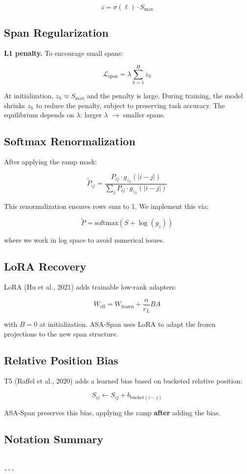 \[
z = \sigma(\ell) \cdot S_\text{max}
\]

\subsection{Span Regularization}

\textbf{L1 penalty.} To encourage small spans:

\[
\mathcal{L}_\text{span} = \lambda \sum_{h=1}^H z_h
\]

At initialization, $z_h \approx S_\text{max}$ and the penalty is large. During 
training, the model shrinks $z_h$ to reduce the penalty, subject to preserving 
task accuracy. The equilibrium depends on $\lambda$: larger $\lambda$ $\to$ 
smaller spans.

\subsection{Softmax Renormalization}

After applying the ramp mask:

\[
\tilde{P}_{ij} = \frac{P_{ij} \cdot g_{z_h}(|i - j|)}{\sum_j P_{ij} \cdot g_{z_h}(|i - j|)}
\]

This renormalization ensures rows sum to 1. We implement this via:

\[
\tilde{P} = \text{softmax}(S + \log(g_z))
\]

where we work in log space to avoid numerical issues.

\subsection{LoRA Recovery}

LoRA (Hu et al., 2021) adds trainable low-rank adapters:

\[
W_\text{eff} = W_\text{frozen} + \frac{\alpha}{r_L} B A
\]

with $B = 0$ at initialization. ASA-Span uses LoRA to adapt the frozen 
projections to the new span structure.

\subsection{Relative Position Bias}

T5 (Raffel et al., 2020) adds a learned bias based on bucketed relative 
position:

\[
S_{ij} \leftarrow S_{ij} + b_{\text{bucket}(i - j)}
\]

ASA-Span preserves this bias, applying the ramp \textbf{after} adding the bias.

\subsection{Notation Summary}

\begin{lstlisting}

---
\end{lstlisting}